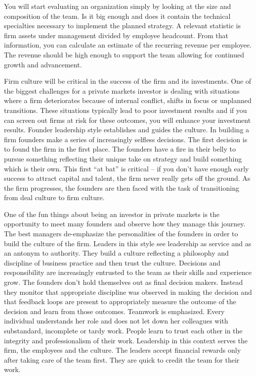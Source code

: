 \documentclass[12pt,english]{article}\usepackage[]{graphicx}\usepackage[]{color}
\begin{document}
You will start evaluating an organization simply by looking at the
size and composition of the team. Is it big enough and does it contain
the technical specialties necessary to implement the planned strategy.
A relevant statistic is firm assets under management divided by employee
headcount. From that information, you can calculate an estimate of
the recurring revenue per employee. The revenue should be high enough
to support the team allowing for continued growth and advancement.

Firm culture will be critical in the success of the firm and its investments.
One of the biggest challenges for a private markets investor is dealing
with situations where a firm deteriorates because of internal conflict,
shifts in focus or unplanned transitions. These situations typically
lead to poor investment results and if you can screen out firms at
risk for these outcomes, you will enhance your investment results.
Founder leadership style establishes and guides the culture. In building
a firm founders make a series of increasingly selfless decisions.
The first decision is to found the firm in the first place. The founders
have a fire in their belly to pursue something reflecting their unique
take on strategy and build something which is their own. This first
``at bat'' is critical -- if you don't have enough early success
to attract capital and talent, the firm never really gets off the
ground. As the firm progresses, the founders are then faced with the
task of transitioning from deal culture to firm culture. 

One of the fun things about being an investor in private markets is
the opportunity to meet many founders and observe how they manage
this journey. The best managers de-emphasize the personalities of
the founders in order to build the culture of the firm. Leaders in
this style see leadership as service and as an antonym to authority.
They build a culture reflecting a philosophy and discipline of business
practice and then trust the culture. Decisions and responsibility
are increasingly entrusted to the team as their skills and experience
grow. The founders don't hold themselves out as final decision makers.
Instead they monitor that appropriate discipline was observed in making
the decision and that feedback loops are present to appropriately
measure the outcome of the decision and learn from those outcomes.
Teamwork is emphasized. Every individual understands her role and
does not let down her colleagues with substandard, incomplete or tardy
work. People learn to trust each other in the integrity and professionalism
of their work. Leadership in this context serves the firm, the employees
and the culture. The leaders accept financial rewards only after taking
care of the team first. They are quick to credit the team for their
work.
\end{document}
